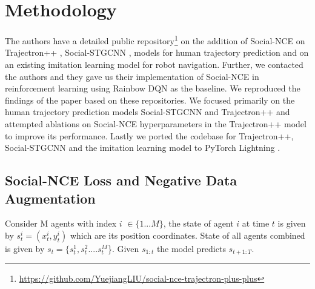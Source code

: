 \section{Methodology}
The authors have a detailed public repository\footnote{\href{https://github.com/YuejiangLIU/social-nce-trajectron-plus-plus}{https://github.com/YuejiangLIU/social-nce-trajectron-plus-plus}} on the addition of Social-NCE on Trajectron++ \cite{salzmann2020trajectron++}, Social-STGCNN \cite{mohamed2020social}, models for human trajectory prediction and on an existing imitation learning model \cite{chen2019crowdnav} for robot navigation. Further, we contacted the authors and they gave us their implementation of Social-NCE in reinforcement learning using Rainbow DQN \cite{hessel2017rainbow} as the baseline. We reproduced the findings of the paper based on these repositories. We focused primarily on the human trajectory prediction models Social-STGCNN and Trajectron++ and attempted ablations on Social-NCE hyperparameters in the Trajectron++ model to improve its performance. Lastly we ported the codebase for Trajectron++, Social-STGCNN and the imitation learning model to PyTorch Lightning \cite{falcon2019pytorch}.

\vspace{90pt}

\subsection{Social-NCE Loss and Negative Data Augmentation}


Consider M agents with index $i$ 	$\in \{1...M\}$, 
the state of agent $i$ at time $t$ is given by $s^{i}_{t} = (x^{i}_{t}, y^{i}_{t})$ which are its position coordinates. 
State of all agents combined is given by $s_t = \{s^{1}_{t}, s^{2}_{t}....s^{M}_{t}$\}.  
Given $s_{1:t}$ the model predicts $s_{t+1:T}$.

